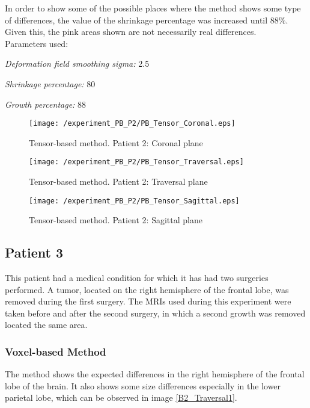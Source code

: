 In order to show some of the possible places where the method shows
some type of differences, the value of the shrinkage percentage was
increased until $88\%$. Given this, the pink areas shown are not
necessarily real differences.\\

Parameters used:
\begin{description}
\item \textit{Deformation field smoothing sigma:} 2.5
\item \textit{Shrinkage percentage:} 80
\item \textit{Growth percentage:} 88
\end{description}

\begin{figure}[H]
  \centering
  \texttt{[image: /experiment\_PB\_P2/PB\_Tensor\_Coronal.eps]}
  \caption{Tensor-based method. Patient 2: Coronal plane}
  \label{PB_TCoronal}
\end{figure}

\begin{figure}[H]
  \centering
  \texttt{[image: /experiment\_PB\_P2/PB\_Tensor\_Traversal.eps]}
  \caption{Tensor-based method. Patient 2: Traversal plane}
  \label{PB_TTraversal}
\end{figure}

\begin{figure}[H]
  \centering
  \texttt{[image: /experiment\_PB\_P2/PB\_Tensor\_Sagittal.eps]}
  \caption{Tensor-based method. Patient 2: Sagittal plane}
  \label{PB_TSagittal}
\end{figure}


\subsection{Patient 3}
This patient had a medical condition for which it has had two
surgeries performed. A tumor, located on the right hemisphere of the
frontal lobe, was removed during the first surgery. The MRIs used
during this experiment were taken before and after the second surgery,
in which a second growth was removed located the same area.


\subsubsection{Voxel-based Method}
The method shows the expected differences in the right hemisphere of
the frontal lobe of the brain. It also shows some size differences
especially in the lower parietal lobe, which can be observed in image
\ref{B2_Traversal1}.\\

